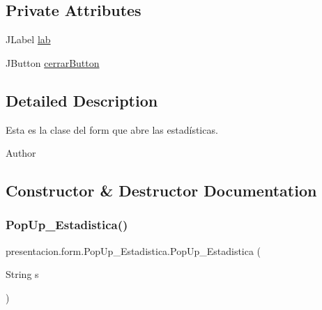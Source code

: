 \subsection*{Private Attributes}
\begin{DoxyCompactItemize}
\item 
J\+Label \hyperlink{classpresentacion_1_1form_1_1PopUp__Estadistica_ac61ead9dea9a28c411062fdc951b4df8}{lab}
\item 
J\+Button \hyperlink{classpresentacion_1_1form_1_1PopUp__Estadistica_aad708c3569f3d964b09867708ba60bf6}{cerrar\+Button}
\end{DoxyCompactItemize}


\subsection{Detailed Description}
Esta es la clase del form que abre las estadísticas. 

\begin{DoxyAuthor}{Author}

\end{DoxyAuthor}


\subsection{Constructor \& Destructor Documentation}
\mbox{\label{classpresentacion_1_1form_1_1PopUp__Estadistica_a7f2277129654afa8b98cf5c48427b023}} 
\subsubsection{\texorpdfstring{Pop\+Up\+\_\+\+Estadistica()}{PopUp\_Estadistica()}}
{\footnotesize\ttfamily presentacion.\+form.\+Pop\+Up\+\_\+\+Estadistica.\+Pop\+Up\+\_\+\+Estadistica (\begin{DoxyParamCaption}\item[{String}]{s }\end{DoxyParamCaption})\hspace{0.3cm}{\ttfamily [inline]}}



